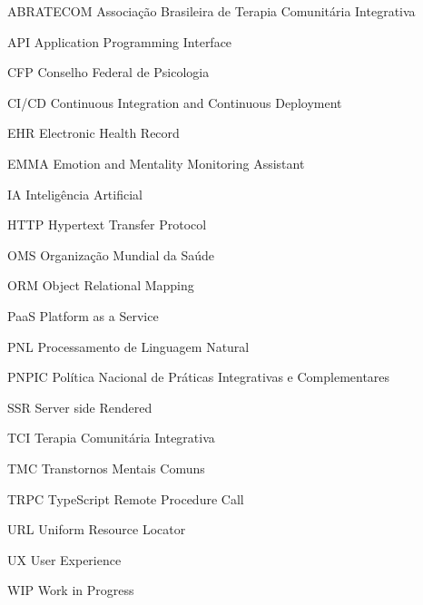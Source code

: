 \begin{siglas}
  
  \item[ABRATECOM] Associação Brasileira de Terapia Comunitária Integrativa
  \item[API] Application Programming Interface
  \item[CFP] Conselho Federal de Psicologia
  \item[CI/CD] Continuous Integration and Continuous Deployment
  \item[EHR] Electronic Health Record
  \item[EMMA] Emotion and Mentality Monitoring Assistant
  \item[IA] Inteligência Artificial
  \item[HTTP] Hypertext Transfer Protocol
  \item[OMS] Organização Mundial da Saúde
  \item[ORM] Object Relational Mapping
  \item[PaaS] Platform as a Service
  \item[PNL] Processamento de Linguagem Natural
  \item[PNPIC] Política Nacional de Práticas Integrativas e Complementares
  \item[SSR] Server side Rendered
  \item[TCI] Terapia Comunitária Integrativa
  \item[TMC]  Transtornos Mentais Comuns
  \item[TRPC] TypeScript Remote Procedure Call
  \item[URL] Uniform Resource Locator
  \item[UX] User Experience
  \item[WIP] Work in Progress
\end{siglas}
